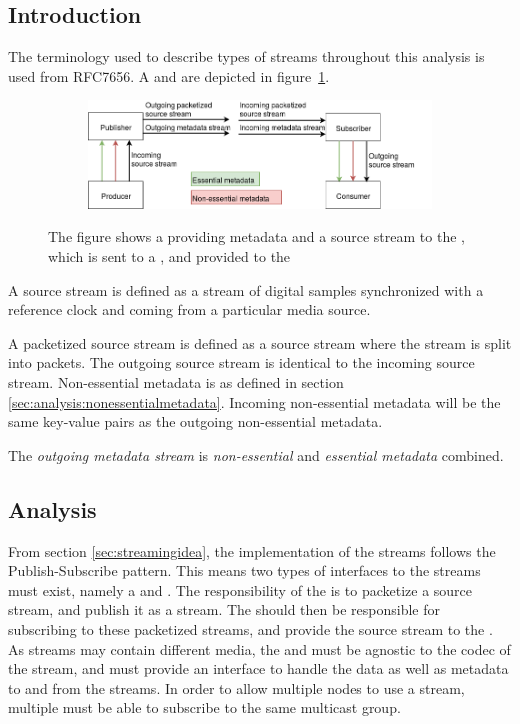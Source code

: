\subsection{Introduction}
The terminology used to describe types of streams throughout this analysis is used from RFC7656\citep{RFC7656}.
A  and  are depicted in figure~\ref{fig:analysis:pubsub}.

\begin{figure}[H]
    \centering
    \begin{subfigure}[b]{1\textwidth}
        \includegraphics[width=\textwidth]{figures/publisher-subscriber}
    \end{subfigure}
     \caption{The  figure shows a  providing metadata and a source stream to the \pub, which is sent to a \sub, and provided to the }\label{fig:analysis:pubsub}
\end{figure}


A source stream is defined as a stream of digital samples synchronized with a reference clock and coming from a particular media source.

A packetized source stream is defined as a source stream where the stream is split into packets.
The outgoing source stream is identical to the incoming source stream.
Non-essential metadata is as defined in section \ref{sec:analysis:nonessentialmetadata}. Incoming non-essential metadata will be the same key-value pairs as the outgoing non-essential metadata.

The \textit{outgoing metadata stream} is \textit{non-essential} and \textit{essential metadata} combined.

\subsection{Analysis} \label{sec:analysis:pubsup:introduction}

From section \ref{sec:streamingidea}, the implementation of the streams follows the Publish-Subscribe pattern. This means two types of interfaces to the streams must exist, namely a \pub{} and \sub{}. The responsibility of the \pub{} is to packetize a source stream, and publish it as a stream. The \subs{} should then be responsible for subscribing to these packetized streams, and provide the source stream to the \con{}.
As streams may contain different media, the  and  must be agnostic to the codec of the stream, and must provide an interface to handle the data as well as metadata to and from the streams.
In order to allow multiple nodes to use a stream, multiple  must be able to subscribe to the same multicast group.\\

